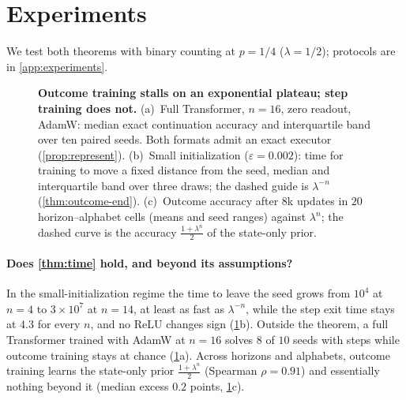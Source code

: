 \suppressfloats[t]
\section{Experiments}
\label{sec:experiments}
\label{sec:validation}

We test both theorems with binary counting at $p=1/4$ ($\lambda=1/2$); protocols are in \cref{app:experiments}.

\begin{figure}[t]
\centering
\resizebox{\linewidth}{!}{}
\caption{\textbf{Outcome training stalls on an exponential plateau; step training does not.}
(a)~Full Transformer, $n=16$, zero readout, AdamW: median exact continuation accuracy and interquartile band over ten
paired seeds. Both formats admit an exact executor (\cref{prop:represent}).
(b)~Small initialization ($\varepsilon=0.002$): time for training to move a fixed distance from the seed, median and
interquartile band over three draws; the dashed guide is $\lambda^{-n}$ (\cref{thm:outcome-end}).
(c)~Outcome accuracy after $8$k updates in $20$ horizon--alphabet cells (means and seed ranges) against $\lambda^n$;
the dashed curve is the accuracy $\frac{1+\lambda^n}2$ of the state-only prior.}
\label{fig:experiments}
\end{figure}

\paragraph{Does \cref{thm:time} hold, and beyond its assumptions?} In the small-initialization regime the time to leave
the seed grows from $10^4$ at $n=4$ to $3\times10^7$ at $n=14$, at least as fast as $\lambda^{-n}$, while the step exit time
stays at $4.3$ for every $n$, and no ReLU changes sign (\cref{fig:experiments}b). Outside the theorem, a full Transformer
trained with AdamW at $n=16$ solves $8$ of $10$ seeds with steps while outcome training stays at chance
(\cref{fig:experiments}a). Across horizons and alphabets, outcome training learns the state-only prior
$\frac{1+\lambda^n}2$ (Spearman $\rho=0.91$) and essentially nothing beyond it (median excess $0.2$ points,
\cref{fig:experiments}c).

